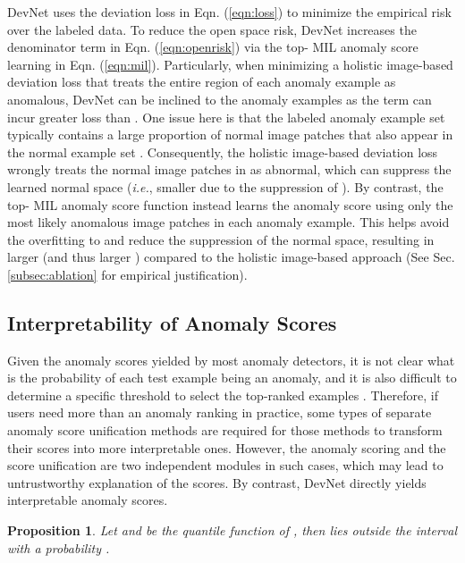 \documentclass[10pt,journal,compsoc]{IEEEtran}
\newtheorem{prop}{Proposition}
\newcommand{\ie}{\textit{i.e.}}
\begin{document}
DevNet uses the deviation loss in Eqn. (\ref{eqn:loss}) to minimize the empirical risk over the labeled data. To reduce the open space risk, DevNet increases the denominator term  in Eqn. (\ref{eqn:openrisk}) via the top- MIL anomaly score learning in Eqn. (\ref{eqn:mil}). Particularly, when minimizing a holistic image-based deviation loss that treats the entire region of each anomaly example as anomalous, DevNet can be inclined to the anomaly examples as the term  can incur greater loss than . One issue here is that the labeled anomaly example set  typically contains a large proportion of normal image patches that also appear in the normal example set . Consequently, the holistic image-based deviation loss wrongly treats the normal image patches in  as abnormal, which can suppress the learned normal space (\ie, smaller  due to the suppression of ).
By contrast, the top- MIL anomaly score function  instead learns the anomaly score using only the most likely anomalous image patches in each anomaly example. This helps avoid the overfitting to  and reduce the suppression of the normal space, resulting in larger  (and thus larger ) compared to the holistic image-based approach (See Sec. \ref{subsec:ablation} for empirical justification). 



\subsection{Interpretability of Anomaly Scores} \label{subsec:interpretability_score}
Given the anomaly scores yielded by most anomaly detectors, it is not clear what is the probability of each test example being an anomaly, and it is also difficult to determine a specific threshold to select the top-ranked examples \cite{kriegel2011interpreting}. Therefore, if users need more than an anomaly ranking in practice, some types of separate anomaly score unification methods \cite{kriegel2011interpreting} are required for those methods to transform their scores into more interpretable ones. However, the anomaly scoring and the score unification are two independent modules in such cases, which may lead to untrustworthy explanation of the scores. By contrast, DevNet directly yields interpretable anomaly scores.

\begin{prop}
Let  and  be the quantile function of , then  lies outside the interval  with a probability .
\end{prop}
\end{document}
